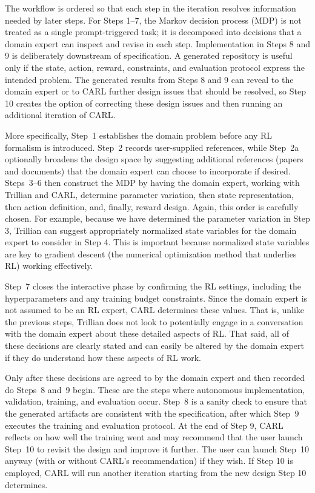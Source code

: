 \documentclass[mnsc,sglanonrev]{informs4}
\begin{document}
The workflow is ordered so that each step in the iteration resolves information needed by later steps. For Steps 1--7, the Markov decision process (MDP) is not treated as a single prompt-triggered task; it is decomposed into decisions that a domain expert can inspect and revise in each step. Implementation in Steps 8 and 9 is deliberately downstream of specification. A generated repository is useful only if the state, action, reward, constraints, and evaluation protocol express the intended problem. The generated results from Steps 8 and 9 can reveal to the domain expert or to CARL further design issues that should be resolved, so Step 10 creates the option of correcting these design issues and then running an additional iteration of CARL. 


More specifically, Step~1 establishes the domain problem before any RL formalism is introduced. Step~2 records user-supplied references, while Step~2a optionally broadens the design space by suggesting additional references (papers and documents) that the domain expert can choose to incorporate if desired. Steps~3--6 then construct the MDP by having the domain expert, working with Trillian and CARL, determine parameter variation, then state representation, then action definition, and, finally, reward design. Again, this order is carefully chosen. For example, because we have determined the parameter variation in Step 3, Trillian can suggest appropriately normalized state variables for the domain expert to consider in Step 4. This is important because normalized state variables are key to gradient descent (the numerical optimization method that underlies RL) working effectively. 

Step~7 closes the interactive phase by confirming the RL settings, including the hyperparameters and any training budget constraints. Since the domain expert is not assumed to be an RL expert, CARL determines these values. That is, unlike the previous steps, Trillian does not look to potentially engage in a conversation with the domain expert about these detailed aspects of RL. That said, all of these decisions are clearly stated and can easily be altered by the domain expert if they do understand how these aspects of RL work. 

Only after these decisions are agreed to by the domain expert and then recorded do Steps~8 and~9 begin. These are the steps where autonomous implementation, validation, training, and evaluation occur. Step~8 is a sanity check to ensure that the generated artifacts are consistent with the specification, after which Step~9 executes the training and evaluation protocol. At the end of Step 9, CARL reflects on how well the training went and may recommend that the user launch Step~10 to revisit the design and improve it further. The user can launch Step~10 anyway (with or without CARL's recommendation) if they wish. If Step 10 is employed, CARL will run another iteration starting from the new design Step 10 determines.
\end{document}
